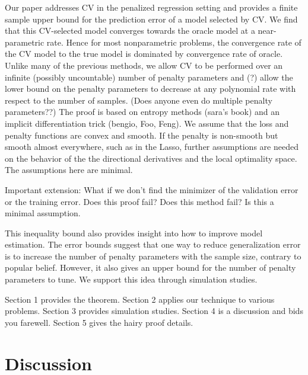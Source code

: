 \documentclass[12pt]{article}
\begin{document}
Our paper addresses CV in the penalized regression setting and provides a finite sample upper bound for the prediction error of a model selected by CV. We find that this CV-selected model converges towards the oracle model at a near-parametric rate. Hence for most nonparametric problems, the convergence rate of the CV model to the true model is dominated by convergence rate of oracle. Unlike many of the previous methods, we allow CV to be performed over an infinite (possibly uncountable) number of penalty parameters and (?) allow the lower bound on the penalty parameters to decrease at any polynomial rate with respect to the number of samples. (Does anyone even do multiple penalty parameters??) The proof is based on entropy methods (sara's book) and an implicit differentiation trick (bengio, Foo, Feng). We assume that the loss and penalty functions are convex and smooth. If the penalty is non-smooth but smooth almost everywhere, such as in the Lasso, further assumptions are needed on the behavior of the the directional derivatives and the local optimality space. The assumptions here are minimal.

Important extension: What if we don't find the minimizer of the validation error or the training error. Does this proof fail? Does this method fail? Is this a minimal assumption.

This inequality bound also provides insight into how to improve model estimation. The error bounds suggest that one way to reduce generalization error is to increase the number of penalty parameters with the sample size, contrary to popular belief. However, it also gives an upper bound for the number of penalty parameters to tune. We support this idea through simulation studies.

Section 1 provides the theorem. Section 2 applies our technique to various problems. Section 3 provides simulation studies. Section 4 is a discussion and bids you farewell. Section 5 gives the hairy proof details.


\section{Discussion}


\bigskip
\end{document}
